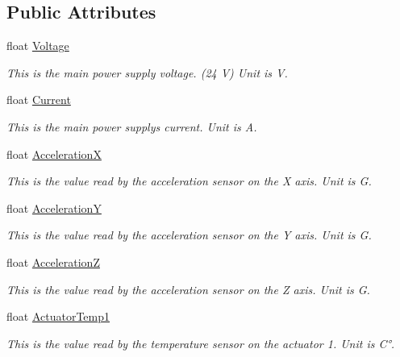 \subsection*{Public Attributes}
\begin{DoxyCompactItemize}
\item 
float \hyperlink{struct_sensors_info_a9ced23ff499026d028b2179945091775}{Voltage}
\begin{DoxyCompactList}\small\item\em This is the main power supply voltage. (24 V) Unit is V. \end{DoxyCompactList}\item 
float \hyperlink{struct_sensors_info_a2be7e431dce5a2093e6f61a7333b574c}{Current}
\begin{DoxyCompactList}\small\item\em This is the main power supply\textquotesingle{}s current. Unit is A. \end{DoxyCompactList}\item 
float \hyperlink{struct_sensors_info_a3d4a04448cbb350ce537758ec9c38e51}{AccelerationX}
\begin{DoxyCompactList}\small\item\em This is the value read by the acceleration sensor on the X axis. Unit is G. \end{DoxyCompactList}\item 
float \hyperlink{struct_sensors_info_af8316a86022a11ef16181d5cbc6e266e}{AccelerationY}
\begin{DoxyCompactList}\small\item\em This is the value read by the acceleration sensor on the Y axis. Unit is G. \end{DoxyCompactList}\item 
float \hyperlink{struct_sensors_info_a98074de49d42dbb1b303e5e68e03cc90}{AccelerationZ}
\begin{DoxyCompactList}\small\item\em This is the value read by the acceleration sensor on the Z axis. Unit is G. \end{DoxyCompactList}\item 
float \hyperlink{struct_sensors_info_a9aa0da9e61455fd8b3faa91ad5970985}{Actuator\+Temp1}
\begin{DoxyCompactList}\small\item\em This is the value read by the temperature sensor on the actuator 1. Unit is C°. \end{DoxyCompactList}\item 

\end{DoxyCompactItemize}
